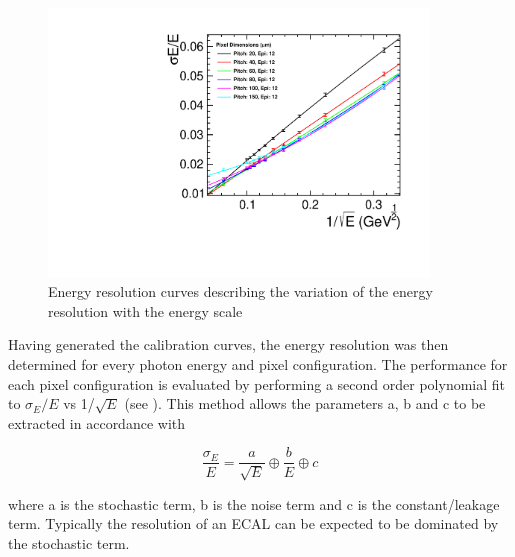 \begin{figure}
  \centering
  \includegraphics[width=0.9\textwidth,keepaspectratio]{DECALStudies/fig/ResolutionFits.pdf}
  \caption{Energy resolution curves describing the variation of the energy resolution with the energy scale}
  \label{fig:resolutionfits}
\end{figure}

Having generated the calibration curves, the energy resolution was then determined for every photon energy and pixel configuration. The performance for each pixel configuration is evaluated by performing a second order polynomial fit to $\sigma_E/E$ vs 1/$\sqrt{E}$ (see ). This method allows the parameters a, b and c to be extracted in accordance with 

\begin{equation}
  \label{eq:resolutionformula}
  \frac{\sigma_E}{E}=\frac{a}{\sqrt{E}} \oplus \frac{b}{E} \oplus c
\end{equation}

where a is the stochastic term, b is the noise term and c is the constant/leakage term. Typically the resolution of an \ac{ECAL} can be expected to be dominated by the stochastic term. 

